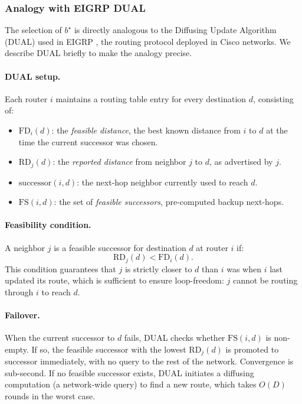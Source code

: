 \documentclass{article}
\begin{document}
\subsubsection{Analogy with EIGRP DUAL}
\label{sec:eigrp}

The selection of $b^\star$ is directly analogous to the Diffusing Update Algorithm (DUAL)
used in EIGRP \citep{garcia1993eigrp}, the routing protocol deployed in Cisco networks.
We describe DUAL briefly to make the analogy precise.

\paragraph{DUAL setup.} Each router $i$ maintains a routing table entry for every
destination $d$, consisting of:
\begin{itemize}
    \item $\mathrm{FD}_i(d)$: the \emph{feasible distance}, the best known distance from
        $i$ to $d$ at the time the current successor was chosen.
    \item $\mathrm{RD}_j(d)$: the \emph{reported distance} from neighbor $j$ to $d$,
        as advertised by $j$.
    \item $\mathrm{successor}(i, d)$: the next-hop neighbor currently used to reach $d$.
    \item $\mathrm{FS}(i, d)$: the set of \emph{feasible successors}, pre-computed
        backup next-hops.
\end{itemize}

\paragraph{Feasibility condition.} A neighbor $j$ is a feasible successor for destination
$d$ at router $i$ if:
\[
    \mathrm{RD}_j(d) < \mathrm{FD}_i(d).
\]
This condition guarantees that $j$ is strictly closer to $d$ than $i$ was when $i$ last
updated its route, which is sufficient to ensure loop-freedom: $j$ cannot be routing
through $i$ to reach $d$.

\paragraph{Failover.} When the current successor to $d$ fails, DUAL checks whether
$\mathrm{FS}(i, d)$ is non-empty. If so, the feasible successor with the lowest
$\mathrm{RD}_j(d)$ is promoted to successor immediately, with no query to the rest of
the network. Convergence is sub-second. If no feasible successor exists, DUAL initiates
a diffusing computation (a network-wide query) to find a new route, which takes $O(D)$
rounds in the worst case.
\end{document}

